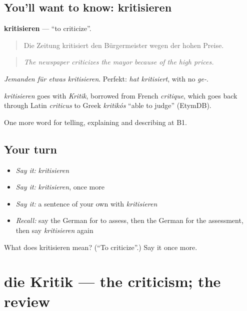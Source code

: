 \subsection*{You'll want to know: kritisieren}
\textbf{kritisieren} — \textquotedblleft{}to criticize\textquotedblright{}.

\begin{quote}
Die Zeitung kritisiert den Bürgermeister wegen der hohen Preise.
\end{quote}

\begin{quote}
\emph{The newspaper criticizes the mayor because of the high prices.}
\end{quote}

\emph{Jemanden für etwas kritisieren}. Perfekt: \emph{hat kritisiert}, with no \emph{ge-}.

\begin{cousinweb}
\emph{kritisieren} goes with \emph{Kritik}, borrowed from French \emph{critique}, which goes back through Latin \emph{criticus} to Greek \emph{kritikós} \textquotedblleft{}able to judge\textquotedblright{} (EtymDB).
\end{cousinweb}

\begin{grammarlens}[title={What you've built}]
One more word for telling, explaining and describing at B1.
\end{grammarlens}

\subsection*{Your turn}
\begin{itemize}
\raggedright
  \item \emph{Say it:} \emph{kritisieren}
  \item \emph{Say it:} \emph{kritisieren}, once more
  \item \emph{Say it:} a sentence of your own with \emph{kritisieren}
  \item \emph{Recall:} say the German for to assess, then the German for the assessment, then say \emph{kritisieren} again
\end{itemize}

\begin{tcolorbox}[breakable,colback=teal!4,colframe=teal!35!black,title={Before you move on}]
What does kritisieren mean? (\textquotedblleft{}To criticize\textquotedblright{}.) Say it once more.
\end{tcolorbox}
\section[die Kritik]{die Kritik — the criticism; the review}

